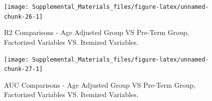 \documentclass[
]{article}
\begin{document}
\begin{figure}

{\centering \texttt{[image: Supplemental\_Materials\_files/figure-latex/unnamed-chunk-26-1]} 

}

\caption{R2 Comparisons - Age Adjusted Group VS Pre-Term Group, Factorized Variables VS. Itemized Variables.}\label{fig:unnamed-chunk-26}
\end{figure}

\begin{figure}

{\centering \texttt{[image: Supplemental\_Materials\_files/figure-latex/unnamed-chunk-27-1]} 

}

\caption{AUC Comparisons - Age Adjusted Group VS Pre-Term Group, Factorized Variables VS. Itemized Variables.}\label{fig:unnamed-chunk-27}
\end{figure}
\end{document}

